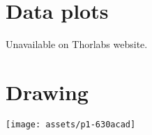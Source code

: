 \documentclass{article}
\begin{document}
\begin{multicols}{2}
\begin{tabular}{|l|l|}
\end{tabular}%

\section{Data plots}

Unavailable on Thorlabs website.

\end{multicols}
\section{Drawing}
\begin{center}
\texttt{[image: assets/p1-630acad]}
\end{center}
\end{document}
